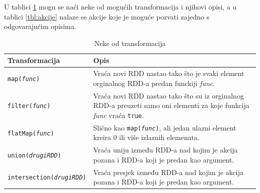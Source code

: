 \documentclass[times, utf8, zavrsni]{fer}
\begin{document}
U tablici \ref{tbl:transformacije} mogu se naći neke od mogućih transformacija i njihovi opisi, a u tablici \ref{tbl:akcije} nalaze se akcije koje je moguće pozvati zajedno s odgovarajućim opisima.
\begin{table}[htb]
\caption{Neke od transformacija}
\label{tbl:transformacije}
\centering
\begin{tabular}{lp{8cm}} 
\hline
Transformacija & Opis \\
\hline
\texttt{map(\emph{func})} & Vraća novi RDD nastao tako što je svaki element orginalnog RDD-a predan funckiji \emph{func}. \\
\texttt{filter(\emph{func})} & Vraća novi RDD nastao tako što su iz orginalnog RDD-a preuzeti samo oni elementi za koje funkcija \emph{func} vraća \texttt{true}. \\
\texttt{flatMap(\emph{func})} & Slično kao \texttt{map(\emph{func})}, ali jedan ulazni element kreira 0 ili više izlaznih elemenata. \\
\texttt{union(\emph{drugiRDD})} & Vraća uniju između RDD-a nad kojim je akcija pozana i RDD-a koji je predan kao argument. \\
\texttt{intersection(\emph{drugiRDD})} & Vraća presjek između RDD-a nad kojim je akcija pozana i RDD-a koji je predan kao argument. \\
\hline
\end{tabular}
\end{table}
\end{document}
